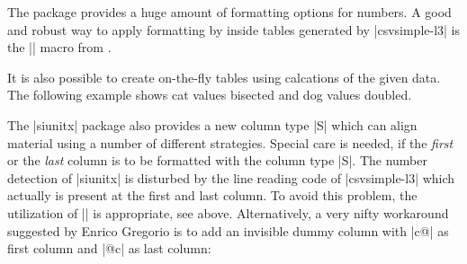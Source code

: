 \documentclass[a4paper,11pt]{ltxdoc}
\begin{document}

\medskip

The  package provides a huge amount of formatting options for
numbers. A good and robust way to apply formatting by  inside
tables generated by |csvsimple-l3| is the |\tablenum| macro from
.

\begin{dispExample}
\end{dispExample}

\clearpage

It is also possible to create on-the-fly tables using calcations of
the given data. The following example shows cat values bisected and
dog values doubled.

\begin{dispExample}
\end{dispExample}


\clearpage

The |siunitx| package also provides a new column type |S|
which can align material using a number of different strategies.
Special care is needed, if the \emph{first} or the \emph{last} column is to be formatted with
the column type |S|. The number detection of |siunitx| is disturbed by
the line reading code of |csvsimple-l3| which actually is present at the
first and last column. To avoid this problem, the utilization of
|\tablenum| is appropriate, see above.
Alternatively, a very nifty workaround suggested by Enrico Gregorio is to
add an invisible dummy column with |c@{}| as first column
and |@{}c| as last column:
\end{document}
